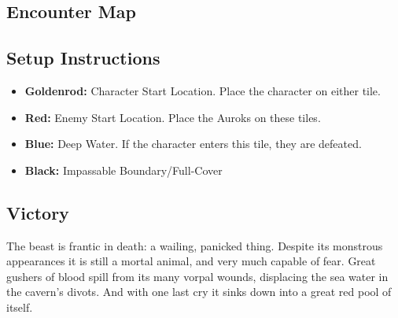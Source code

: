 \subsection*{Encounter Map}
\begin{center}
\end{center}

\subsection*{Setup Instructions}
\begin{itemize}
\item \textbf{Goldenrod:} Character Start Location. Place the character on either tile.
\item \textbf{Red:} Enemy Start Location. Place the Auroks on these tiles.
\item \textbf{Blue:} Deep Water. If the character enters this tile, they are defeated.
\item \textbf{Black:} Impassable Boundary/Full-Cover
\end{itemize}

\pagebreak

\subsection*{Victory}
The beast is frantic in death: a wailing, panicked thing. Despite its monstrous appearances it is still a mortal animal, and very much capable of fear. Great gushers of blood spill from its many vorpal wounds, displacing the sea water in the cavern's divots. And with one last cry it sinks down into a great red pool of itself.\\

